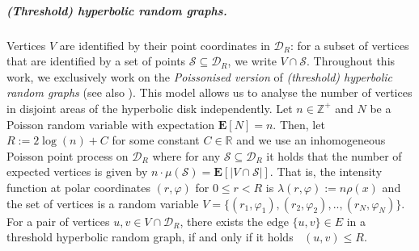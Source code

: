 \documentclass[letterpaper,11pt]{article}
\newcommand{\E}[1]{\mathbf{E}\left[#1\right]}
\newcommand{\disk}{\ensuremath{\mathcal D_R}\xspace}
\newcommand{\1}{\mathbb I}
\DeclareMathOperator{\dist}{d_h}
\newcommand{\intensity}{\lambda}
\newcounter{ctr}
\begin{document}
\subparagraph{(Threshold) hyperbolic random graphs.} Vertices $V$ are identified by their point coordinates in $\disk$: for a subset of vertices that are identified by a set of points $\mathcal{S} \subseteq \disk$, we write $V \cap \mathcal{S}$. Throughout this work, we exclusively work on the \emph{Poissonised version} of \emph{(threshold) hyperbolic random graphs} (see also \cite{Kiwi2024, hrg-spectral, km-slcrhg-19}).  This model allows us to analyse the number of vertices in disjoint areas of the hyperbolic disk independently. Let $n \in \mathbb{Z}^+$ and $N$ be a Poisson random variable with expectation $\E{N} = n$. Then, let $R:= 2\log(n) + C$ for some constant $C \in \mathbb{R}$ and we use an inhomogeneous Poisson point process on $\disk$ where for any $\mathcal{S} \subseteq \disk$ it holds that the number of expected vertices is given by $n\cdot\mu(\mathcal{S}) = \E{|V \cap \mathcal{S}|}$. That is, the intensity function at polar coordinates $(r, \varphi)$ for $0\leq r < R$ is $\intensity(r, \varphi):=n\rho(x)$ and the set of vertices is a random variable $V = \{(r_1,\varphi_1), (r_2,\varphi_2),.., (r_N,\varphi_N)\}$. For a pair of vertices $u,v \in V \cap \disk$, there exists the edge $\{u,v\} \in E$ in a threshold hyperbolic random graph, if and only if it holds $\dist(u,v) \leq R$.

\smallskip
\end{document}
